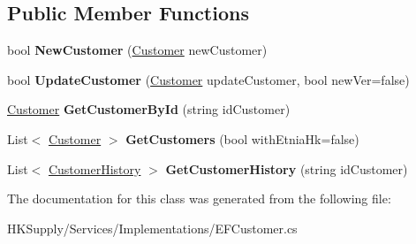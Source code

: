 \subsection*{Public Member Functions}
\begin{DoxyCompactItemize}
\item 
\mbox{\label{class_h_k_supply_1_1_services_1_1_implementations_1_1_e_f_customer_a8caba8c3706d212709d73ff4e2e94e1e}} 
bool {\bfseries New\+Customer} (\mbox{\hyperlink{class_h_k_supply_1_1_models_1_1_customer}{Customer}} new\+Customer)
\item 
\mbox{\label{class_h_k_supply_1_1_services_1_1_implementations_1_1_e_f_customer_af7bd47be2eff71310dd5ad5e4157bfa4}} 
bool {\bfseries Update\+Customer} (\mbox{\hyperlink{class_h_k_supply_1_1_models_1_1_customer}{Customer}} update\+Customer, bool new\+Ver=false)
\item 
\mbox{\label{class_h_k_supply_1_1_services_1_1_implementations_1_1_e_f_customer_a88c703ed6108d30abbed42876d524fb3}} 
\mbox{\hyperlink{class_h_k_supply_1_1_models_1_1_customer}{Customer}} {\bfseries Get\+Customer\+By\+Id} (string id\+Customer)
\item 
\mbox{\label{class_h_k_supply_1_1_services_1_1_implementations_1_1_e_f_customer_a46dcd4d00e35c397796283e099675547}} 
List$<$ \mbox{\hyperlink{class_h_k_supply_1_1_models_1_1_customer}{Customer}} $>$ {\bfseries Get\+Customers} (bool with\+Etnia\+Hk=false)
\item 
\mbox{\label{class_h_k_supply_1_1_services_1_1_implementations_1_1_e_f_customer_abf8c1b2099630d5ca64afb2fb773699e}} 
List$<$ \mbox{\hyperlink{class_h_k_supply_1_1_models_1_1_customer_history}{Customer\+History}} $>$ {\bfseries Get\+Customer\+History} (string id\+Customer)
\end{DoxyCompactItemize}


The documentation for this class was generated from the following file\+:\begin{DoxyCompactItemize}
\item 
H\+K\+Supply/\+Services/\+Implementations/E\+F\+Customer.\+cs\end{DoxyCompactItemize}
